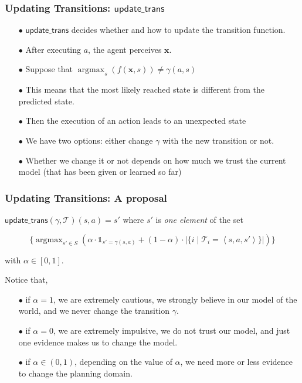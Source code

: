 \documentclass{beamer}
\DeclareMathOperator*{\argmax}{argmax}
\def\updgamma{\mathsf{update\_trans}}
\def\bx{\pmb{x}}
\def\T{\mathcal{T}}
\begin{document}
\begin{frame} 
  \frametitle{Updating Transitions: $\updgamma$} 

\begin{itemize}
\item[$\bullet$] 
$\updgamma$ decides whether and how to update the transition function.
\pause
\item[$\bullet$]
After executing $a$, the agent perceives $\bx$. 
\pause
\item[$\bullet$]
Suppose that $\argmax_{s}(f(\bx,s)) \neq \gamma(a,s)$
\pause
\item[$\bullet$]
This means that the most likely reached state is different from the predicted state.
\pause
\item[$\bullet$]
Then the execution of an action leads to an unexpected state
\pause
\item[$\bullet$]
We have two options: either change $\gamma$ with the new transition or not.
\pause
\item[$\bullet$]
{\color {red} Whether we change it or not depends on how much we trust the current model (that has been given or learned so far)}
\end{itemize}
\end{frame}

\begin{frame} 
  \frametitle{Updating Transitions: A proposal} 

$\updgamma(\gamma,\T)(s,a)=s'$  where $s'$ is \emph{one element}
of the set

$$
\{\argmax_{s'\in S}\left(\alpha\cdot\mathbb{1}_{s'=\gamma(s,a)}+
    (1-\alpha)\cdot|\{i\mid \T_i=\left<s,a,s'\right>\}|
\right)\}
$$

with $\alpha\in[0,1]$.

\pause
\vspace{1cm}
Notice that,
\begin{itemize}
\item[$\bullet$] 
if {\color {red} $\alpha = 1$}, we are extremely cautious, we strongly believe in our
model of the world, and we never change the transition $\gamma$.
\pause
\item[$\bullet$] 
if {\color {red} $\alpha = 0$}, we are extremely impulsive, we do not trust our model,
and just one evidence makes us to change the model.
\pause
\item[$\bullet$] 
if {\color {red} $\alpha \in (0,1)$}, depending on the value of
$\alpha$, we need more or less evidence to change the planning
domain.
\end{itemize}

\end{frame}
\end{document}
